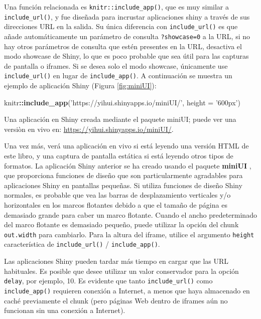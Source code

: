 \documentclass[12pt,]{krantz}
\makeatletter
\newenvironment{Shaded}{\begin{snugshade}}{\end{snugshade}}
\newcommand{\KeywordTok}[1]{\textcolor[rgb]{0.13,0.29,0.53}{\textbf{#1}}}
\newcommand{\DataTypeTok}[1]{\textcolor[rgb]{0.13,0.29,0.53}{#1}}
\newcommand{\StringTok}[1]{\textcolor[rgb]{0.31,0.60,0.02}{#1}}
\newcommand{\OperatorTok}[1]{\textcolor[rgb]{0.81,0.36,0.00}{\textbf{#1}}}
\newcommand{\NormalTok}[1]{#1}
\let\oldhref\href
\renewcommand{\href}[2]{#2\footnote{\url{#1}}}
\newenvironment{kframe}{%
\medskip{}
\setlength{\fboxsep}{.8em}
 \def\at@end@of@kframe{}%
 \ifinner\ifhmode%
  \def\at@end@of@kframe{\end{minipage}}%
  \begin{minipage}{\columnwidth}%
 \fi\fi%
 \def\FrameCommand##1{\hskip\@totalleftmargin \hskip-\fboxsep
 \colorbox{shadecolor}{##1}\hskip-\fboxsep
     \hskip-\linewidth \hskip-\@totalleftmargin \hskip\columnwidth}%
 \MakeFramed {\advance\hsize-\width
   \@totalleftmargin\z@ \linewidth\hsize
   \@setminipage}}%
 {\par\unskip\endMakeFramed%
 \at@end@of@kframe}
\renewenvironment{Shaded}{\begin{kframe}}{\end{kframe}}
\theoremstyle{definition}
\theoremstyle{definition}
\theoremstyle{definition}
\theoremstyle{remark}
\makeatother
\begin{document}
Una función relacionada es \texttt{knitr::include\_app()}, que es muy
similar a \texttt{include\_url()}, y fue diseñada para incrustar
aplicaciones shiny a través de sus direcciones URL en la salida. Su
única diferencia con \texttt{include\_url()} es que añade
automáticamente un parámetro de consulta \texttt{?showcase=0} a la URL,
si no hay otros parámetros de consulta que estén presentes en la URL,
desactiva el modo showcase de Shiny, lo que es poco probable que sea
útil para las capturas de pantalla o iframes. Si se desea solo el modo
showcase, únicamente use \texttt{include\_url()} en lugar de
\texttt{include\_app()}. A continuación se muestra un ejemplo de
aplicación Shiny (Figura \ref{fig:miniUI}):

\let\ooldhref\href
\let\href\oldhref

\begin{Shaded}
\begin{Highlighting}[]
\NormalTok{knitr}\OperatorTok{::}\KeywordTok{include_app}\NormalTok{(}\StringTok{'https://yihui.shinyapps.io/miniUI/'}\NormalTok{, }\DataTypeTok{height =} \StringTok{'600px'}\NormalTok{)}
\end{Highlighting}
\end{Shaded}

\label{fig:miniUI}Una aplicación en Shiny creada mediante el paquete miniUI;
puede ver una versiòn en vivo en:
\url{https://yihui.shinyapps.io/miniUI/}.

\let\href\ooldhref

Una vez más, verá una aplicación en vivo si está leyendo una versión
HTML de este libro, y una captura de pantalla estática si está leyendo
otros tipos de formatos. La aplicación Shiny anterior se ha creado
usando el paquete \textbf{miniUI} \citep{R-miniUI}, que proporciona
funciones de diseño que son particularmente agradables para aplicaciones
Shiny en pantallas pequeñas. Si utiliza funciones de diseño Shiny
normales, es probable que vea las barras de desplazamiento verticales
y/o horizontales en los marcos flotantes debido a que el tamaño de
página es demasiado grande para caber un marco flotante. Cuando el ancho
predeterminado del marco flotante es demasiado pequeño, puede utilizar
la opción del chunk \texttt{out.width} para cambiarlo. Para la altura
del iframe, utilice el argumento \texttt{height} característica de
\texttt{include\_url()} / \texttt{include\_app()}.

Las aplicaciones Shiny pueden tardar más tiempo en cargar que las URL
habituales. Es posible que desee utilizar un valor conservador para la
opción \texttt{delay}, por ejemplo, 10. Es evidente que tanto
\texttt{include\_url()} como \texttt{include\_app()} requieren conexión
a Internet, a menos que haya almacenado en caché previamente el chunk
(pero páginas Web dentro de iframes aún no funcionan sin una conexión a
Internet).
\end{document}
